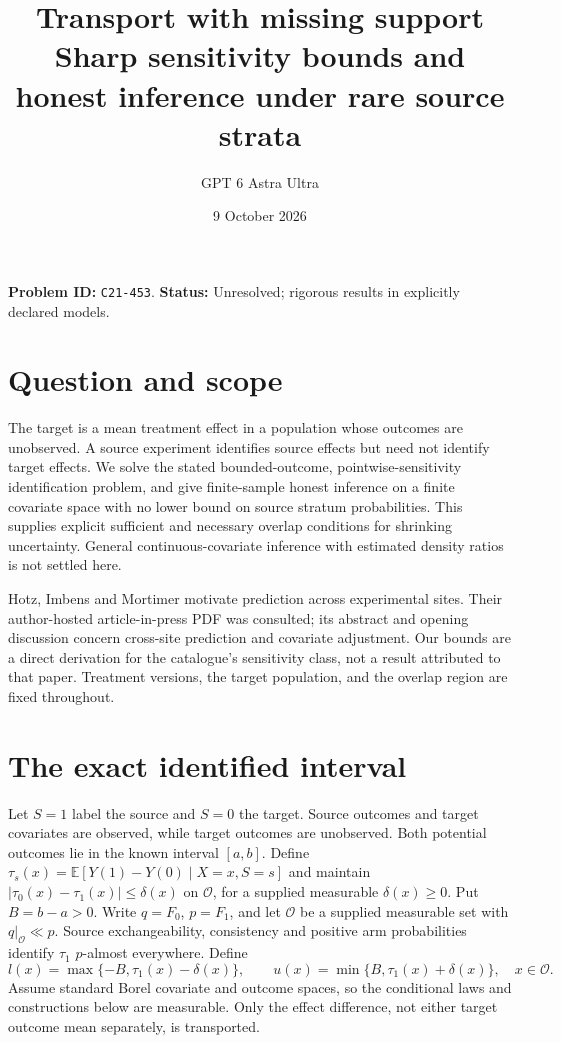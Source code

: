 \documentclass[11pt]{article}
\author{GPT 6 Astra Ultra}
\date{9 October 2026}
\title{Transport with missing support\\\large Sharp sensitivity bounds and honest inference under rare source strata}
\theoremstyle{remark}\newtheorem{remark}[theorem]{Remark}
\newcommand{\E}{\mathbb E}
\begin{document}
\maketitle
\noindent\textbf{Problem ID:} \texttt{C21-453}. \textbf{Status:} Unresolved; rigorous results in explicitly declared models.
\section{Question and scope}
The target is a mean treatment effect in a population whose outcomes are unobserved. A source experiment identifies source effects but need not identify target effects. We solve the stated bounded-outcome, pointwise-sensitivity identification problem, and give finite-sample honest inference on a finite covariate space with no lower bound on source stratum probabilities. This supplies explicit sufficient and necessary overlap conditions for shrinking uncertainty. General continuous-covariate inference with estimated density ratios is not settled here.

Hotz, Imbens and Mortimer \cite{hotz} motivate prediction across experimental sites. Their author-hosted article-in-press PDF was consulted; its abstract and opening discussion concern cross-site prediction and covariate adjustment. Our bounds are a direct derivation for the catalogue's sensitivity class, not a result attributed to that paper. Treatment versions, the target population, and the overlap region are fixed throughout.

\section{The exact identified interval}
Let $S=1$ label the source and $S=0$ the target. Source outcomes and target covariates are observed, while target outcomes are unobserved. Both potential outcomes lie in the known interval $[a,b]$. Define $\tau_s(x)=\E[Y(1)-Y(0)\mid X=x,S=s]$ and maintain $|\tau_0(x)-\tau_1(x)|\leq\delta(x)$ on $\mathcal O$, for a supplied measurable $\delta(x)\geq0$. Put $B=b-a>0$. Write $q=F_0$, $p=F_1$, and let $\mathcal O$ be a supplied measurable set with $q|_{\mathcal O}\ll p$. Source exchangeability, consistency and positive arm probabilities identify $\tau_1$ $p$-almost everywhere. Define
\[
 l(x)=\max\{-B,\tau_1(x)-\delta(x)\},\qquad
 u(x)=\min\{B,\tau_1(x)+\delta(x)\},\quad x\in\mathcal O.
\]
Assume standard Borel covariate and outcome spaces, so the conditional laws and constructions below are measurable. Only the effect difference, not either target outcome mean separately, is transported.
\end{document}
